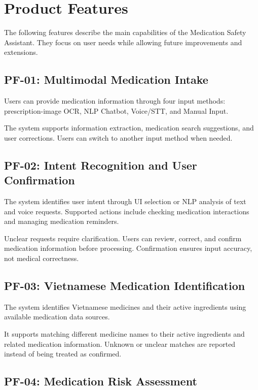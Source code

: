 
\section{Product Features}

The following features describe the main
capabilities of the Medication Safety Assistant.
They focus on user needs while allowing
future improvements and extensions.

\subsection{PF-01: Multimodal Medication Intake}

Users can provide medication information
through four input methods: prescription-image
OCR, NLP Chatbot, Voice/STT, and Manual Input.

The system supports information extraction,
medication search suggestions, and user
corrections. Users can switch to another
input method when needed.

\subsection{PF-02: Intent Recognition and User Confirmation}

The system identifies user intent through
UI selection or NLP analysis of text and
voice requests. Supported actions include
checking medication interactions and
managing medication reminders.

Unclear requests require clarification.
Users can review, correct, and confirm
medication information before processing.
Confirmation ensures input accuracy,
not medical correctness.

\subsection{PF-03: Vietnamese Medication Identification}

The system identifies Vietnamese medicines
and their active ingredients using available
medication data sources.

It supports matching different medicine
names to their active ingredients and
related medication information.
Unknown or unclear matches are reported
instead of being treated as confirmed.

\subsection{PF-04: Medication Risk Assessment}

